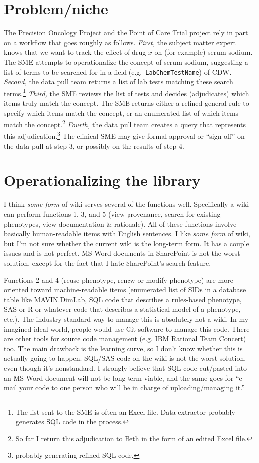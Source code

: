 \documentclass{tufte-handout}
\begin{document}
\section{Problem/niche}

The Precision Oncology Project and the Point of Care Trial project
rely in part on a workflow that goes roughly as follows. \emph{First,}
the subject matter expert knows that we want to track the effect of
drug $x$ on (for example) serum sodium. The SME attempts to
operationalize the concept of serum sodium, suggesting a list of terms
to be searched for in a field (e.g.\ \texttt{LabChemTestName}) of CDW.
\emph{Second,} the data pull team returns a list of lab tests matching
these search terms.\footnote{The list sent to the SME is often an
  Excel file. Data extractor probably generates SQL code in the
  process.} \emph{Third,} the SME reviews the list of tests and
decides (adjudicates) which items truly match the concept. The SME
returns either a refined general rule to specify which items match the
concept, or an enumerated list of which items match the
concept.\footnote{So far I return this adjudication to Beth in the
  form of an edited Excel file.} \emph{Fourth,} the data pull team
creates a query that represents this adjudication.\footnote{probably
  generating refined SQL code.} The clinical SME may give formal
approval or ``sign off'' on the data pull at step 3, or possibly on
the results of step 4.

\section{Operationalizing the library}

I think \emph{some form} of wiki serves several of the functions well.
Specifically a wiki can perform functions 1, 3, and 5 (view
provenance, search for existing phenotypes, view documentation \&
rationale). All of these functions involve basically human-readable
items with English sentences. I like \emph{some form} of wiki, but I'm
not sure whether the current wiki is the long-term form. It has a
couple issues and is not perfect. MS Word documents in SharePoint is
not the worst solution, except for the fact that I hate SharePoint's
search feature.

Functions 2 and 4 (reuse phenotype, renew or modify phenotype) are
more oriented toward machine-readable items (enumerated list of SIDs
in a database table like MAVIN.DimLab, SQL code that describes a
rules-based phenotype, SAS or R or whatever code that describes a
statistical model of a phenotype, etc.). The industry standard way to
manage this is absolutely not a wiki. In my imagined ideal world,
people would use Git software to manage this code. There are other
tools for source code management (e.g. IBM Rational Team Concert) too.
The main drawback is the learning curve, so I don't know whether this
is actually going to happen. SQL/SAS code on the wiki is not the worst
solution, even though it's nonstandard. I strongly believe that SQL
code cut/pasted into an MS Word document will not be long-term viable,
and the same goes for ``e-mail your code to one person who will be in
charge of uploading/managing it.''
\end{document}
